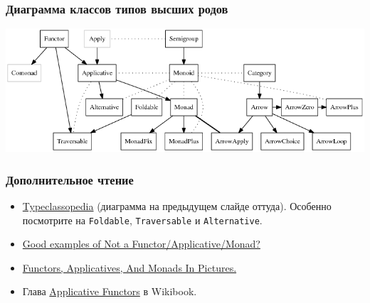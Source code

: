 \documentclass[11pt]{beamer}
\begin{document}
\begin{frame}[fragile]
  \frametitle{Диаграмма классов типов высших родов}
  \includegraphics[width=\linewidth]{Typeclassopedia-diagram.png}
\end{frame}

%
%

\begin{frame}[fragile]
  \frametitle{Дополнительное чтение}
  \begin{itemize}
    \item \href{https://wiki.haskell.org/Typeclassopedia}{Typeclassopedia} (диаграмма на предыдущем слайде оттуда). Особенно посмотрите на \lstinline|Foldable|, \lstinline|Traversable| и \lstinline|Alternative|.
    \item \href{https://stackoverflow.com/questions/7220436/good-examples-of-not-a-functor-functor-applicative-monad}{Good examples of Not a Functor/Applicative/Monad?}
    \item     \href{http://adit.io/posts/2013-04-17-functors,_applicatives,_and_monads_in_pictures.html}{Functors, Applicatives, And Monads In Pictures.}
    \item Глава \href{https://en.wikibooks.org/wiki/Haskell/Applicative_functors}{Applicative Functors} в Wikibook.
  \end{itemize}
\end{frame}
\end{document}
